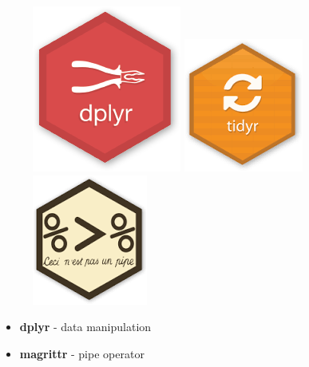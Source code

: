 \documentclass[TIDYMASTER.tex]{subfiles}
\begin{document}
	\begin{frame}
		\vspace{-0.5cm}
		\LARGE		\begin{figure}
			\centering
			\includegraphics[width=0.35\linewidth]{images/dplyr-hexbin-logo}
			\includegraphics[width=0.35\linewidth]{images/TidyRLogo}
		\includegraphics[width=0.35\linewidth]{images/magrittr}
\end{figure}
		\begin{itemize}
			\item \textbf{dplyr} - data manipulation
			
			
			\item \textbf{magrittr} - pipe operator
		\end{itemize}
		
	\end{frame}
\end{document}
